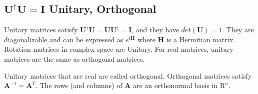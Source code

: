 \subsection{$\mathbf{U}^{\dagger}\mathbf{U} = \mathbf{I}$ Unitary, Orthogonal}
Unitary matrices satisfy $\mathbf{U}^{\dagger}\mathbf{U} = \mathbf{UU}^{\dagger}=\mathbf{I}$, and they have $det(\mathbf{U}) = 1$. They are diagonalizable and can be expressed as $e^{i\mathbf{H}}$ where $\mathbf{H}$ is a Hermitian matrix. Rotation matrices in complex space are Unitary. For real matrices, unitary matrices are the same as orthogonal matrices.

Unitary matrices that are real are called orthogonal.  Orthogonal matrices satisfy $\mathbf{A}^{-1} = \mathbf{A}^T$. The rows (and columns) of $\mathbf{A}$ are an orthonormal basis in $\mathrm{R}^n$.


